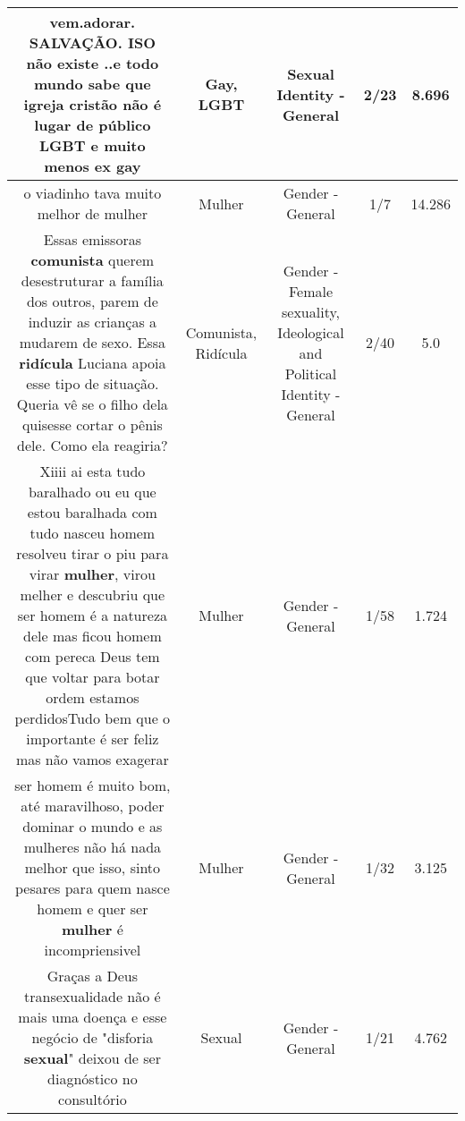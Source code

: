 \documentclass[11pt]{article}
\newlength\mylength
\begin{document}
\begin{center}
\begin{longtable}{|C{.65\mylength}|C{.30\mylength}|C{.12\mylength}|C{.12\mylength}|C{.12\mylength}|}
  \small vem.adorar. SALVAÇÃO. ISO não existe ..e todo mundo sabe que igreja cristão não é lugar de público \textbf{LGBT} e muito menos ex gay\normalsize   & Gay, LGBT & Sexual Identity - General & 2/23 & 8.696 \\  \hline
  \small o viadinho tava muito melhor de mulher\normalsize   & Mulher & Gender - General & 1/7 & 14.286 \\  \hline
  \small Essas emissoras \textbf{comunista} querem desestruturar a família dos outros, parem de induzir as crianças a mudarem de sexo. Essa \textbf{ridícula} Luciana apoia esse tipo de situação. Queria vê se o filho dela quisesse cortar o pênis dele. Como ela reagiria?\normalsize   & Comunista, Ridícula & Gender - Female sexuality, Ideological and Political Identity - General & 2/40 & 5.0 \\  \hline
  \small Xiiii ai esta tudo baralhado ou eu que estou baralhada com tudo nasceu homem resolveu tirar o piu para virar \textbf{mulher}, virou melher e descubriu que ser homem é a natureza dele mas ficou homem com pereca Deus tem que voltar para botar ordem estamos perdidosTudo bem que o importante é ser feliz mas não vamos exagerar\normalsize   & Mulher & Gender - General & 1/58 & 1.724 \\  \hline
  \small ser homem é muito bom, até maravilhoso, poder dominar o mundo e as mulheres não há nada melhor que isso, sinto pesares para  quem nasce homem e quer ser \textbf{mulher} é incompriensivel\normalsize   & Mulher & Gender - General & 1/32 & 3.125 \\  \hline
  \small Graças a Deus transexualidade não é mais uma doença e esse negócio de "disforia \textbf{sexual}" deixou de ser diagnóstico no consultório\normalsize   & Sexual & Gender - General & 1/21 & 4.762 \\  \hline

\end{longtable}
\end{center}
\end{document}
